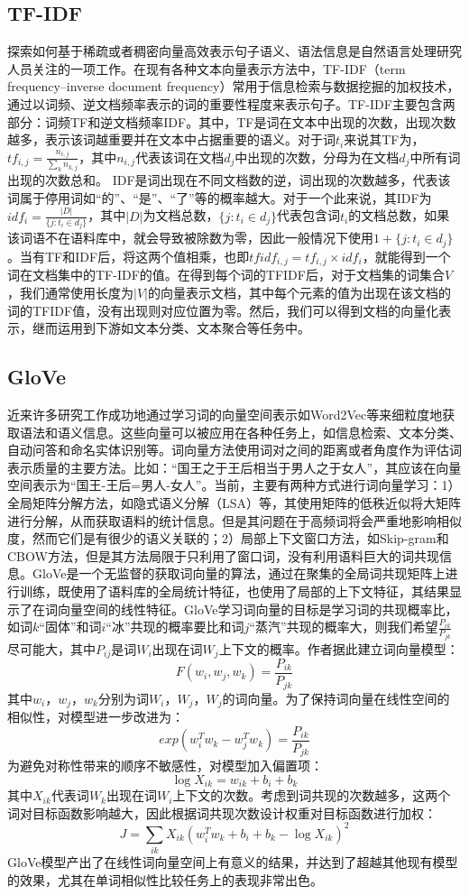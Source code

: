 \subsection{TF-IDF}
探索如何基于稀疏或者稠密向量高效表示句子语义、语法信息是自然语言处理研究人员关注的一项工作。在现有各种文本向量表示方法中，TF-IDF（term frequency–inverse document frequency）\cite{chowdhury2010introduction}常用于信息检索与数据挖掘的加权技术，通过以词频、逆文档频率表示的词的重要性程度来表示句子。TF-IDF主要包含两部分：词频TF和逆文档频率IDF。其中，TF是词在文本中出现的次数，出现次数越多，表示该词越重要并在文本中占据重要的语义。对于词$t_i$来说其TF为，$tf_{i,j}=\frac{n_{i,j}}{\sum_k{n_{k,j}}}$，其中$n_{i,j}$代表该词在文档$d_j$中出现的次数，分母为在文档$d_j$中所有词出现的次数总和。
IDF是词出现在不同文档数的逆，词出现的次数越多，代表该词属于停用词如“的”、“是”、“了”等的概率越大。对于一个此来说，其IDF为$idf_{i}=\frac{|D|}{\{j:t_i \in d_j\}}$，其中$|D|$为文档总数，$\{j:t_i \in d_j\}$代表包含词$t_i$的文档总数，如果该词语不在语料库中，就会导致被除数为零，因此一般情况下使用$1+\{j:t_i \in d_j\}$。当有TF和IDF后，将这两个值相乘，也即$tfidf_{i,j}=tf_{i,j}\times idf_i$，就能得到一个词在文档集中的TF-IDF的值。在得到每个词的TFIDF后，对于文档集的词集合$V$，我们通常使用长度为$|V|$的向量表示文档，其中每个元素的值为出现在该文档的词的TFIDF值，没有出现则对应位置为零。然后，我们可以得到文档的向量化表示，继而运用到下游如文本分类、文本聚合等任务中。
\subsection{GloVe}
近来许多研究工作成功地通过学习词的向量空间表示如Word2Vec\cite{mikolov2013distributed}等来细粒度地获取语法和语义信息。这些向量可以被应用在各种任务上，如信息检索、文本分类、自动问答和命名实体识别等。词向量方法使用词对之间的距离或者角度作为评估词表示质量的主要方法。比如：“国王之于王后相当于男人之于女人”，其应该在向量空间表示为“国王-王后=男人-女人”。当前，主要有两种方式进行词向量学习：1）全局矩阵分解方法，如隐式语义分解（LSA）\cite{deerwester1990indexing}等，其使用矩阵的低秩近似将大矩阵进行分解，从而获取语料的统计信息。但是其问题在于高频词将会严重地影响相似度，然而它们是有很少的语义关联的；2）局部上下文窗口方法，如Skip-gram和CBOW方法\cite{mikolov2013distributed}，但是其方法局限于只利用了窗口词，没有利用语料巨大的词共现信息。GloVe是一个无监督的获取词向量的算法，通过在聚集的全局词共现矩阵上进行训练，既使用了语料库的全局统计特征，也使用了局部的上下文特征，其结果显示了在词向量空间的线性特征。GloVe学习词向量的目标是学习词的共现概率比，如词$k$“固体”和词$i$“冰”共现的概率要比和词$j$“蒸汽”共现的概率大，则我们希望$\frac{P_{ik}}{P_{jk}}$尽可能大，其中$P_{ij}$是词$W_i$出现在词$W_j$上下文的概率。作者据此建立词向量模型：
$$F(w_i, w_j, w_k) = \frac{P_{ik}}{P_{jk}}$$
其中$w_i，w_j，w_k$分别为词$W_i，W_j，W_j$的词向量。为了保持词向量在线性空间的相似性，对模型进一步改进为：
$$exp(w_i^Tw_k-w_j^Tw_k)=\frac{P_{ik}}{P_{jk}}$$
为避免对称性带来的顺序不敏感性，对模型加入偏置项：
$$\log X_{ik}=w_{ik}+b_i+b_k$$
其中$X_{ik}$代表词$W_k$出现在词$W_i$上下文的次数。考虑到词共现的次数越多，这两个词对目标函数影响越大，因此根据词共现次数设计权重对目标函数进行加权：
$$J=\sum_{ik}X_{ik}(w_i^Tw_k+b_i+b_k-\log X_{ik})^2$$
GloVe模型产出了在线性词向量空间上有意义的结果，并达到了超越其他现有模型的效果，尤其在单词相似性比较任务上的表现非常出色。

